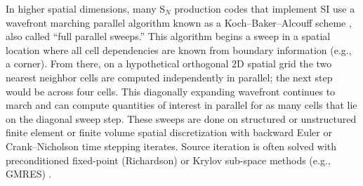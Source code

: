 In higher spatial dimensions, many S$_N$ production codes that implement SI use a wavefront marching parallel algorithm known as a Koch--Baker--Alcouff scheme \cite{baker_sn_2017}, also called ``full parallel sweeps.''
This algorithm begins a sweep in a spatial location where all cell dependencies are known from boundary information (e.g., a corner).
From there, on a hypothetical orthogonal 2D spatial grid the two nearest neighbor cells are computed independently in parallel; the next step would be across four cells.
This diagonally expanding wavefront continues to march and can compute quantities of interest in parallel for as many cells that lie on the diagonal sweep step.
These sweeps are done on structured or unstructured finite element or finite volume spatial discretization with backward Euler or Crank--Nicholson time stepping iterates.
Source iteration is often solved with preconditioned fixed-point (Richardson) or Krylov sub-space methods (e.g., GMRES) \cite{adams_fast_2002}.




